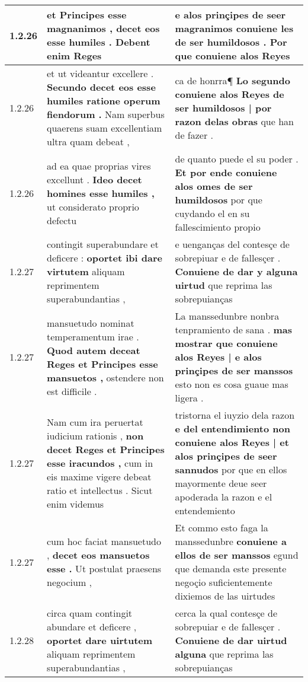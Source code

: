 \begin{tabular}{|p{1cm}|p{6.5cm}|p{6.5cm}|}
1.2.26 & et Principes esse magnanimos , \textbf{ decet eos esse humiles . } Debent enim Reges & e alos prinçipes de seer magranimos \textbf{ conuiene les de ser humildosos . } Por que conuiene alos Reyes \\\hline
1.2.26 & et ut videantur excellere . \textbf{ Secundo decet eos esse humiles ratione operum fiendorum . } Nam superbus quaerens suam excellentiam ultra quam debeat , & ca de honrra¶ \textbf{ Lo segundo conuiene alos Reyes de ser humildosos | por razon delas obras } que han de fazer . \\\hline
1.2.26 & ad ea quae proprias vires excellunt . \textbf{ Ideo decet homines esse humiles , } ut considerato proprio defectu & de quanto puede el su poder . \textbf{ Et por ende conuiene alos omes de ser humildosos } por que cuydando el en su fallescimiento propio \\\hline
1.2.27 & contingit superabundare et deficere : \textbf{ oportet ibi dare virtutem } aliquam reprimentem superabundantias , & e uenganças del contesçe de sobrepiuar e de fallesçer . \textbf{ Conuiene de dar y alguna uirtud } que reprima las sobrepuianças \\\hline
1.2.27 & mansuetudo nominat temperamentum irae . \textbf{ Quod autem deceat Reges et Principes esse mansuetos , } ostendere non est difficile . & La manssedunbre nonbra tenpramiento de sana . \textbf{ mas mostrar que conuiene alos Reyes | e alos prinçipes de ser manssos } esto non es cosa guaue mas ligera . \\\hline
1.2.27 & Nam cum ira peruertat iudicium rationis , \textbf{ non decet Reges et Principes esse iracundos , } cum in eis maxime vigere debeat ratio et intellectus . Sicut enim videmus & tristorna el iuyzio dela razon \textbf{ e del entendimiento non conuiene alos Reyes | et alos prinçipes de seer sannudos } por que en ellos mayormente deue seer apoderada la razon e el entendemiento \\\hline
1.2.27 & cum hoc faciat mansuetudo , \textbf{ decet eos mansuetos esse . } Ut postulat praesens negocium , & Et commo esto faga la manssedunbre \textbf{ conuiene a ellos de ser manssos } egund que demanda este presente negoçio suficientemente dixiemos de las uirtudes \\\hline
1.2.28 & circa quam contingit abundare et deficere , \textbf{ oportet dare uirtutem } aliquam reprimentem superabundantias , & cerca la qual contesçe de sobrepuiar e de fallesçer . \textbf{ Conuiene de dar uirtud alguna } que reprima las sobrepuianças \\\hline

\end{tabular}
